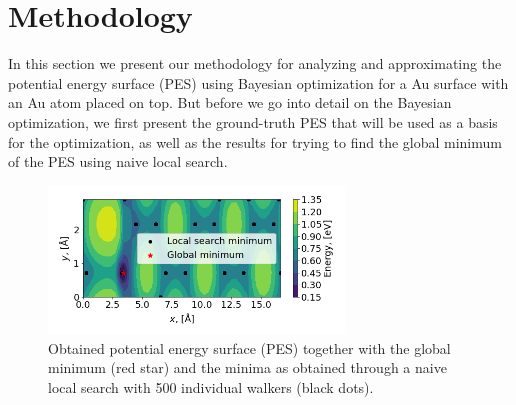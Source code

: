 \documentclass[11pt,a4paper]{article}
\begin{document}
\section{Methodology}

In this section we present our methodology for analyzing and approximating the potential energy surface (PES) using Bayesian optimization for a Au surface with an Au atom placed on top. But before we go into detail on the Bayesian optimization, we first present the ground-truth PES that will be used as a basis for the optimization, as well as the results for trying to find the global minimum of the PES using naive local search.


\begin{figure}[ht]
    \centering
    \includegraphics[width=0.7\textwidth]{figures/task12.png}
    \caption{Obtained potential energy surface (PES) together with the global minimum (red star) and the minima as obtained through a naive local search with 500 individual walkers (black dots). }
    \label{fig:pes}
\end{figure}
\end{document}
